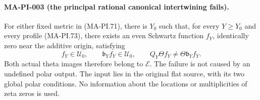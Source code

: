 \paragraph{MA-PI-003 (the principal rational canonical intertwining fails).}
For either fixed metric in (MA-PI.71), there is $Y_0$ such that,
for every $Y\ge Y_0$ and every profile (MA-PI.73), there exists
an even Schwartz function $f_Y$, identically zero near the
additive origin, satisfying
\[
 f_Y\in\mathcal U_0,\qquad \mathfrak b_Y f_Y\in\mathcal U_0,
 \qquad Q_Y\Theta f_Y\ne\Theta\mathfrak b_Y f_Y.
 \tag{MA-PI.74}
\]
Both actual theta images therefore belong to $\mathcal E$.
The failure is not caused by an undefined polar output.
The input lies in the original flat source, with its two
global polar conditions. No information about the locations
or multiplicities of zeta zeros is used.

